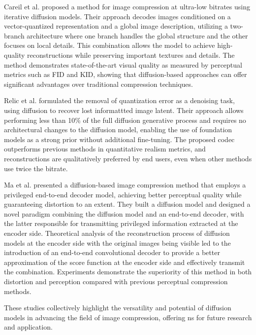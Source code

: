 Careil et al. \cite{Careil2024towards} proposed a method for image compression at ultra-low bitrates using iterative diffusion models. Their approach decodes images conditioned on a vector-quantized representation and a global image description, utilizing a two-branch architecture where one branch handles the global structure and the other focuses on local details. This combination allows the model to achieve high-quality reconstructions while preserving important textures and details. The method demonstrates state-of-the-art visual quality as measured by perceptual metrics such as FID and KID, showing that diffusion-based approaches can offer significant advantages over traditional compression techniques.

Relic et al. \cite{Relic2024lossy} formulated the removal of quantization error as a denoising task, using diffusion to recover lost informattted image latent. Their approach allows performing less than 10\% of the full diffusion generative process and requires no architectural changes to the diffusion model, enabling the use of foundation models as a strong prior without additional fine-tuning. The proposed codec outperforms previous methods in quantitative realism metrics, and reconstructions are qualitatively preferred by end users, even when other methods use twice the bitrate.

Ma et al. \cite{ma2024correcting} presented a diffusion-based image compression method that employs a privileged end-to-end decoder model, achieving better perceptual quality while guaranteeing distortion to an extent. They built a diffusion model and designed a novel paradigm combining the diffusion model and an end-to-end decoder, with the latter responsible for transmitting privileged information extracted at the encoder side. Theoretical analysis of the reconstruction process of diffusion models at the encoder side with the original images being visible led to the introduction of an end-to-end convolutional decoder to provide a better approximation of the score function at the encoder side and effectively transmit the combination. Experiments demonstrate the superiority of this method in both distortion and perception compared with previous perceptual compression methods.

These studies collectively highlight the versatility and potential of diffusion models in advancing the field of image compression, offering ns for future research and application.
